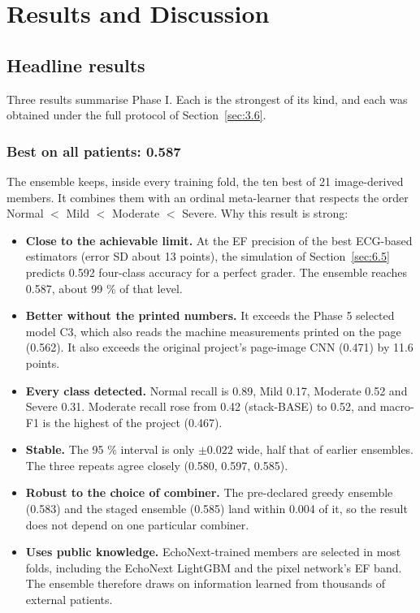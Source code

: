 \chapter{Results and Discussion}\label{ch:6}

\section{Headline results}\label{sec:6.1}



Three results summarise Phase I. Each is the strongest of its kind, and each was obtained under the full protocol of Section~\ref{sec:3.6}.

\subsection{Best on all patients: 0.587}\label{sec:6.1.1}

The ensemble keeps, inside every training fold, the ten best of 21 image-derived members. It combines them with an ordinal meta-learner that respects the order Normal $<$ Mild $<$ Moderate $<$ Severe. Why this result is strong:

\begin{itemize}
  \item \textbf{Close to the achievable limit.} At the EF precision of the best ECG-based estimators (error SD about 13 points), the simulation of Section~\ref{sec:6.5} predicts 0.592 four-class accuracy for a perfect grader. The ensemble reaches 0.587, about 99 \% of that level.
  \item \textbf{Better without the printed numbers.} It exceeds the Phase 5 selected model C3, which also reads the machine measurements printed on the page (0.562). It also exceeds the original project's page-image CNN (0.471) by 11.6 points.
  \item \textbf{Every class detected.} Normal recall is 0.89, Mild 0.17, Moderate 0.52 and Severe 0.31. Moderate recall rose from 0.42 (stack-BASE) to 0.52, and macro-F1 is the highest of the project (0.467).
  \item \textbf{Stable.} The 95 \% interval is only $\pm0.022$ wide, half that of earlier ensembles. The three repeats agree closely (0.580, 0.597, 0.585).
  \item \textbf{Robust to the choice of combiner.} The pre-declared greedy ensemble (0.583) and the staged ensemble (0.585) land within 0.004 of it, so the result does not depend on one particular combiner.
  \item \textbf{Uses public knowledge.} EchoNext-trained members are selected in most folds, including the EchoNext LightGBM and the pixel network's EF band. The ensemble therefore draws on information learned from thousands of external patients.
\end{itemize}
